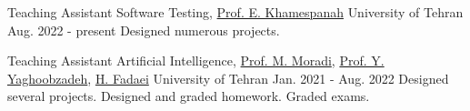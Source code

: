 \begin{cventries}

\tchentry
    {Teaching Assistant} %
    {Software Testing, \href{https://ece.ut.ac.ir/en/~e.khamespanah}{Prof. E. Khamespanah}} %
    {University of Tehran} %
    {Aug. 2022 - present} %
    {
      Designed numerous projects.
    }


\tchentry
    {Teaching Assistant} %
    {Artificial Intelligence, \href{https://ece.ut.ac.ir/en/~moradih}{Prof. M. Moradi}, \href{https://ece.ut.ac.ir/en/~105908695}{Prof. Y. Yaghoobzadeh}, \href{https://ece.ut.ac.ir/en/~students/h.fadaei}{H. Fadaei}} %
    {University of Tehran} %
    {Jan. 2021 - Aug. 2022} %
    {
      Designed several projects. Designed and graded homework. Graded exams.
    }

\end{cventries}
